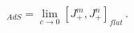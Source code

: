 \begin{equation}
     [J^m_+,J^n_+]_{AdS}=
     \lim_{c\rightarrow 0}[J^m_+,J^n_+]_{flat}\,.
\end{equation}


